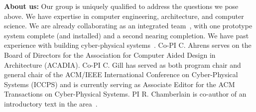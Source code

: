 \noindent
{\bf About us:}
Our group is uniquely qualified to address the questions we pose above.
We have expertise in computer engineering, architecture, and computer
science. We are already collaborating as an integrated team~\cite{cag18},
with one prototype system complete (and installed) and a second
nearing completion.  We have past experience with building cyber-physical
systems~\cite{cew18,wgl17}.
Co-PI C. Ahrens serves on the Board of Directors for the
Association for Computer Aided Design in Architecture (ACADIA).
Co-PI C. Gill has served as both program
chair and general chair of the ACM/IEEE International
Conference on Cyber-Physical Systems (ICCPS) and is currently
serving as Associate Editor for the ACM Transactions on Cyber-Physical
Systems.
PI R. Chamberlain is co-author of an introductory text in the area~\cite{cc17}.
